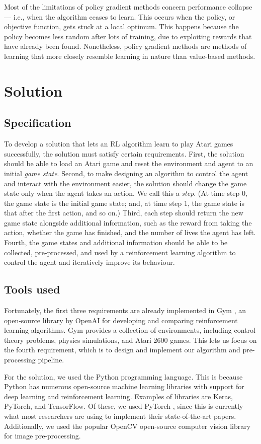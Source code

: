 \documentclass[12pt,a4paper]{article}
\begin{document}
Most of the limitations of policy gradient methods concern performance collapse --- i.e., when the algorithm ceases to learn. This occurs when the policy, or objective function, gets stuck at a local optimum. This happens because the policy becomes less random after lots of training, due to exploiting rewards that have already been found. Nonetheless, policy gradient methods are methods of learning that more closely resemble learning in nature than value-based methods.

\section{Solution}
\subsection{Specification}
To develop a solution that lets an RL algorithm learn to play Atari games successfully, the solution must satisfy certain requirements. First, the solution should be able to load an Atari game and reset the environment and agent to an initial \emph{game state}. Second, to make designing an algorithm to control the agent and interact with the environment easier, the solution should change the game state only when the agent takes an action. We call this a \emph{step}. (At time step 0, the game state is the initial game state; and, at time step 1, the game state is that after the first action, and so on.) Third, each step should return the new game state alongside additional information, such as the reward from taking the action, whether the game has finished, and the number of lives the agent has left. Fourth, the game states and additional information should be able to be collected, pre-processed, and used by a reinforcement learning algorithm to control the agent and iteratively improve its behaviour.

\subsection{Tools used}
Fortunately, the first three requirements are already implemented in Gym \cite{1606.01540}, an open-source library by OpenAI for developing and comparing reinforcement learning algorithms. Gym provides a collection of environments, including control theory problems, physics simulations, and Atari 2600 games. This lets us focus on the fourth requirement, which is to design and implement our algorithm and pre-processing pipeline.

For the solution, we used the Python programming language. This is because Python has numerous open-source machine learning libraries with support for deep learning and reinforcement learning. Examples of libraries are Keras, PyTorch, and TensorFlow. Of these, we used PyTorch \cite{NEURIPS2019_9015}, since this is currently what most researchers are using to implement their state-of-the-art papers. Additionally, we used the popular OpenCV \cite{opencv_library} open-source computer vision library for image pre-processing.
\end{document}
